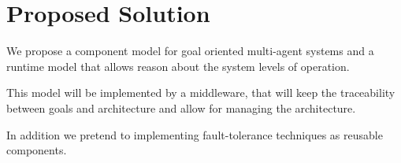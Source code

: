 \section{Proposed Solution}

We propose a component model for goal oriented multi-agent systems  and a runtime model that allows reason about the system levels of operation.

This model will be implemented by a middleware, that will keep the traceability between goals and architecture and allow for managing the architecture.

In addition we pretend to implementing fault-tolerance techniques as reusable components.
